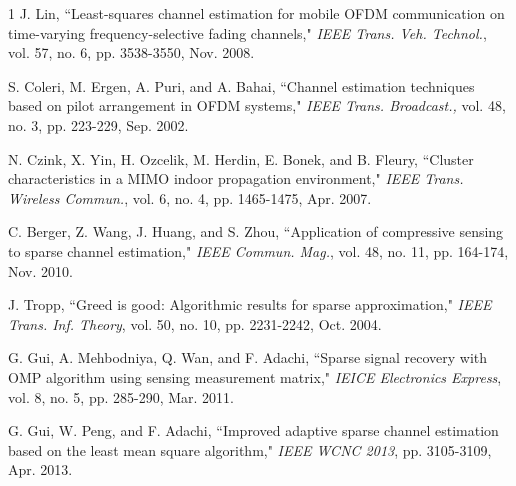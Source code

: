 \documentclass[conference]{IEEEtran}
\begin{document}
\begin{thebibliography}{1}
J. Lin, ``Least-squares channel estimation for mobile OFDM communication on time-varying frequency-selective fading channels," \emph{IEEE Trans. Veh. Technol.}, vol. 57, no. 6, pp. 3538-3550, Nov. 2008.


S. Coleri, M. Ergen, A. Puri, and A. Bahai, ``Channel estimation techniques based on pilot arrangement in OFDM systems," \emph{IEEE Trans. Broadcast.,} vol. 48, no. 3, pp. 223-229, Sep. 2002.

N. Czink, X. Yin, H. Ozcelik, M. Herdin, E. Bonek, and B. Fleury, ``Cluster characteristics in a MIMO indoor propagation environment," \emph{IEEE Trans. Wireless Commun.}, vol. 6, no. 4, pp. 1465-1475, Apr. 2007.


C. Berger, Z. Wang, J. Huang, and S. Zhou, ``Application of compressive sensing to sparse channel estimation," \emph{IEEE Commun. Mag.}, vol. 48, no. 11, pp. 164-174, Nov. 2010.

J. Tropp, ``Greed is good: Algorithmic results for sparse approximation," \emph{IEEE Trans. Inf. Theory}, vol. 50, no. 10, pp. 2231-2242, Oct. 2004.

G. Gui, A. Mehbodniya, Q. Wan, and F. Adachi, ``Sparse signal recovery with OMP algorithm using sensing measurement matrix," \emph{IEICE Electronics Express}, vol. 8, no. 5, pp. 285-290, Mar. 2011.

G. Gui, W. Peng, and F. Adachi, ``Improved adaptive sparse channel estimation based on the least mean square algorithm,"
\emph{IEEE WCNC 2013}, pp. 3105-3109, Apr. 2013.



\end{thebibliography}
\end{document}
